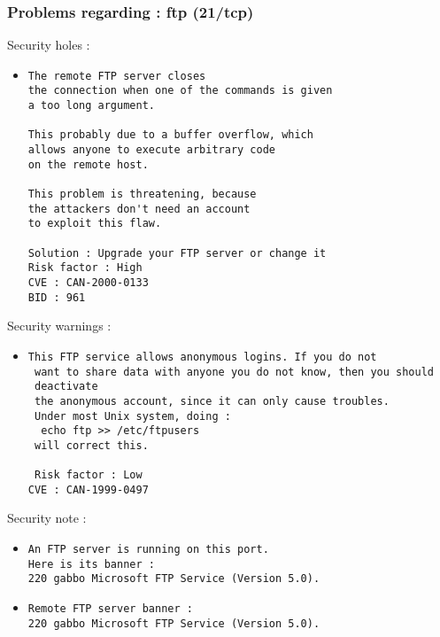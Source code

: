 \documentclass{article}
\begin{document}
\subsubsection{Problems regarding : ftp (21/tcp)}
Security holes :\\
\begin{itemize}
\item \begin{verbatim}
The remote FTP server closes
the connection when one of the commands is given
a too long argument. 

This probably due to a buffer overflow, which
allows anyone to execute arbitrary code
on the remote host.

This problem is threatening, because
the attackers don't need an account 
to exploit this flaw.

Solution : Upgrade your FTP server or change it
Risk factor : High
CVE : CAN-2000-0133
BID : 961
\end{verbatim}\end{itemize}
Security warnings :\\
\begin{itemize}
\item \begin{verbatim}
This FTP service allows anonymous logins. If you do not
 want to share data with anyone you do not know, then you should
 deactivate
 the anonymous account, since it can only cause troubles.
 Under most Unix system, doing : 
  echo ftp >> /etc/ftpusers
 will correct this.
 
 Risk factor : Low
CVE : CAN-1999-0497
\end{verbatim}\end{itemize}
Security note :\\
\begin{itemize}
\item \begin{verbatim}
An FTP server is running on this port.
Here is its banner : 
220 gabbo Microsoft FTP Service (Version 5.0).
\end{verbatim}\item \begin{verbatim}
Remote FTP server banner :
220 gabbo Microsoft FTP Service (Version 5.0).
\end{verbatim}\end{itemize}
\end{document}

